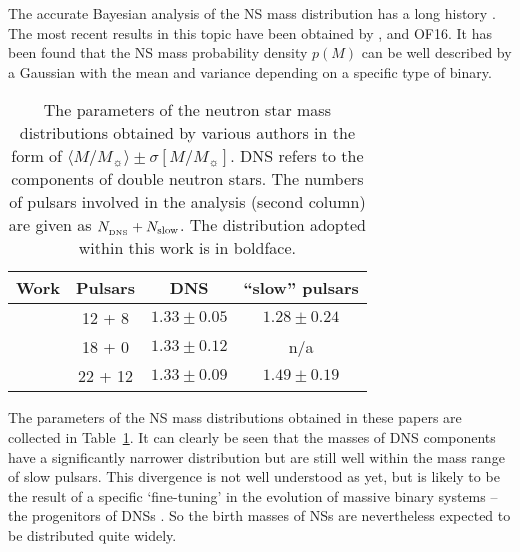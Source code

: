 \documentclass[fleqn,usenatbib]{mnras}
\begin{document}
The accurate Bayesian analysis of the NS mass distribution has a
long history \citep[e.g][]{finn94, thor99, swa10}. The most recent results in this
topic have been obtained by \cite{ozel12},
\cite{kiz13} and OF16. It has been found that the NS mass probability density $p(M)$ can be well described by a Gaussian with the mean and
variance depending on a specific type of binary.

\begin{table}
\centering
\caption{The parameters of the neutron star mass distributions obtained by
various authors in the form of $\langle M/M_{\sun} \rangle \pm \sigma[M/M_{\sun}]$. DNS refers to the components
of double neutron stars. The numbers of pulsars involved in the analysis
(second column) are given as $N_{\rm _{DNS}}
+ N_{\rm slow}$. The distribution adopted within
this work is in boldface.}
\label{tab:nsmass}
\begin{centering}
\begin{tabular}{lccc}
  \hline
  Work & Pulsars & DNS & ``slow'' pulsars \\
  \hline
	\cite{ozel12} & 12 + 8 & $1.33 \pm 0.05$ & $1.28 \pm 0.24$\\
	\cite{kiz13} & 18 + 0& $1.33 \pm 0.12$ & n/a \\
	\cite{ozel16} & 22 + 12 & $1.33 \pm 0.09$ & $\mathbf{1.49 \pm 0.19}$ \\
	\hline
\end{tabular}
\end{centering}
	\label{tab:masses}
\end{table}

The parameters of the NS mass distributions obtained in these
papers are collected in Table~\ref{tab:masses}. It can clearly be seen that the masses
of DNS components have a significantly narrower distribution but are still well within the mass range of slow pulsars. This divergence
is not well understood as yet, but is likely to be the result of a
specific `fine-tuning' in the evolution of massive binary systems --
the progenitors of DNSs \citep
[e.g.][OF16]{postnov14}. So
the birth masses of NSs are nevertheless expected to be distributed
quite widely.
\end{document}

